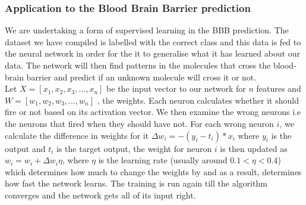 \documentclass[a4paper,12pt]{report}
\begin{document}
			\subsubsection{Application to the Blood Brain Barrier prediction}
			We are undertaking a form of supervised learning in the BBB prediction. The dataset we have compiled is labelled with the correct class and this data is fed to the neural network in order for the it to generalise what it has learned about our data. The network will then find patterns in the molecules that cross the blood-brain barrier and predict if an unknown molecule will cross it or not. \\
			Let $X = [x_1,x_2,x_3,...,x_n]$ be the input vector to our network for $n$ features and $W=[w_1,w_2,w_3,...,w_n]$ , the weights. Each neuron calculates whether it should fire or not based on its activation vector. We then examine the wrong neurons i.e the neurons that fired when they should have not. For each wrong neuron $i$, we calculate the difference in weights for it $\Delta w_i = -(y_i - t_i) * x_i$ where $y_i$ is the output and $t_i$ is the target output, the weight for neuron $i$ is then updated as $w_i = w_i + \Delta w_i\eta$, where $\eta$ is the learning rate (usually around $0.1 < \eta < 0.4$) which determines how much to change the weights by and as a result, determines how fast the network learns. The training is run again till the algorithm converges and the network gets all of its input right.
\end{document}
